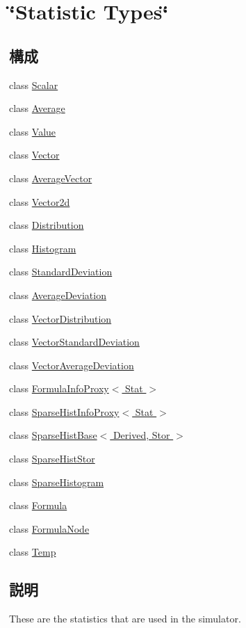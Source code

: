 \hypertarget{group__VisibleStats}{
\section{\char`\"{}Statistic Types\char`\"{}}
\label{group__VisibleStats}
}
\subsection*{構成}
\begin{DoxyCompactItemize}
\item 
class \hyperlink{classStats_1_1Scalar}{Scalar}
\item 
class \hyperlink{classStats_1_1Average}{Average}
\item 
class \hyperlink{classStats_1_1Value}{Value}
\item 
class \hyperlink{classStats_1_1Vector}{Vector}
\item 
class \hyperlink{classStats_1_1AverageVector}{AverageVector}
\item 
class \hyperlink{classStats_1_1Vector2d}{Vector2d}
\item 
class \hyperlink{classStats_1_1Distribution}{Distribution}
\item 
class \hyperlink{classStats_1_1Histogram}{Histogram}
\item 
class \hyperlink{classStats_1_1StandardDeviation}{StandardDeviation}
\item 
class \hyperlink{classStats_1_1AverageDeviation}{AverageDeviation}
\item 
class \hyperlink{classStats_1_1VectorDistribution}{VectorDistribution}
\item 
class \hyperlink{classStats_1_1VectorStandardDeviation}{VectorStandardDeviation}
\item 
class \hyperlink{classStats_1_1VectorAverageDeviation}{VectorAverageDeviation}
\item 
class \hyperlink{classStats_1_1FormulaInfoProxy}{FormulaInfoProxy$<$ Stat $>$}
\item 
class \hyperlink{classStats_1_1SparseHistInfoProxy}{SparseHistInfoProxy$<$ Stat $>$}
\item 
class \hyperlink{classStats_1_1SparseHistBase}{SparseHistBase$<$ Derived, Stor $>$}
\item 
class \hyperlink{classStats_1_1SparseHistStor}{SparseHistStor}
\item 
class \hyperlink{classStats_1_1SparseHistogram}{SparseHistogram}
\item 
class \hyperlink{classStats_1_1Formula}{Formula}
\item 
class \hyperlink{classStats_1_1FormulaNode}{FormulaNode}
\item 
class \hyperlink{classStats_1_1Temp}{Temp}
\end{DoxyCompactItemize}


\subsection{説明}
These are the statistics that are used in the simulator. 